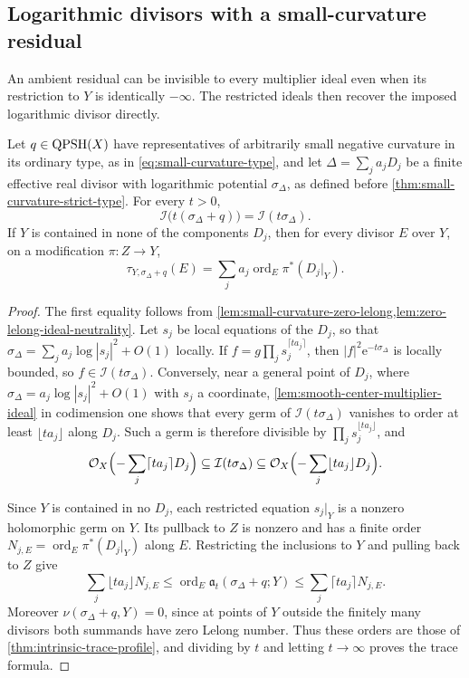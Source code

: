 \subsection{Logarithmic divisors with a small-curvature residual}
\label{subsec:small-curvature-intrinsic-traces}

An ambient residual can be invisible to every multiplier ideal even
when its restriction to $Y$ is identically $-\infty$. The restricted
ideals then recover the imposed logarithmic divisor directly.

\begin{proposition}\label{prop:small-curvature-intrinsic-traces}
Let $q\in\mathrm{QPSH}(X)$ have representatives of arbitrarily small negative
curvature in its ordinary type, as in \eqref{eq:small-curvature-type},
and let $\Delta=\sum_ja_jD_j$ be a finite effective real divisor with
logarithmic potential $\sigma_\Delta$, as defined before
\cref{thm:small-curvature-strict-type}. For every $t>0$,
\[
 \mathcal I\bigl(t(\sigma_\Delta+q)\bigr)
                  =\mathcal I(t\sigma_\Delta).
\]
If $Y$ is contained in none of the components $D_j$, then for every
divisor $E$ over $Y$, on a modification $\pi\colon Z\to Y$,
\[
 \tau_{Y,\sigma_\Delta+q}(E)
     =\sum_ja_j\operatorname{ord}_E\pi^*(D_j|_Y).
\]
\end{proposition}
\begin{proof}
The first equality follows from
\cref{lem:small-curvature-zero-lelong,lem:zero-lelong-ideal-neutrality}.
Let $s_j$ be local equations of the $D_j$, so that
$\sigma_\Delta=\sum_ja_j\log|s_j|^2+O(1)$ locally. If
$f=g\prod_js_j^{\lceil ta_j\rceil}$, then
$|f|^2\mathrm e^{-t\sigma_\Delta}$ is locally bounded, so
$f\in\mathcal I(t\sigma_\Delta)$. Conversely, near a general point of
$D_j$, where $\sigma_\Delta=a_j\log|s_j|^2+O(1)$ with $s_j$ a
coordinate, \cref{lem:smooth-center-multiplier-ideal} in codimension one
shows that every germ of $\mathcal I(t\sigma_\Delta)$ vanishes to order
at least $\lfloor ta_j\rfloor$ along $D_j$. Such a germ is therefore
divisible by $\prod_js_j^{\lfloor ta_j\rfloor}$, and
\[
 \mathcal O_X\Bigl(-\sum_j\lceil ta_j\rceil D_j\Bigr)
 \subseteq\mathcal I(t\sigma_\Delta)
 \subseteq\mathcal O_X\Bigl(-\sum_j\lfloor ta_j\rfloor D_j\Bigr).
\]

Since $Y$ is contained in no $D_j$, each restricted equation $s_j|_Y$
is a nonzero holomorphic germ on $Y$. Its pullback to $Z$ is nonzero
and has a finite order $N_{j,E}=\operatorname{ord}_E\pi^*(D_j|_Y)$ along
$E$. Restricting the inclusions to $Y$ and pulling back to $Z$ give
\[
 \sum_j\lfloor ta_j\rfloor N_{j,E}
 \leq\operatorname{ord}_E\mathfrak a_t(\sigma_\Delta+q;Y)
 \leq\sum_j\lceil ta_j\rceil N_{j,E}.
\]
Moreover $\nu(\sigma_\Delta+q,Y)=0$, since at points of $Y$ outside the
finitely many divisors both summands have zero Lelong number. Thus these
orders are those of \cref{thm:intrinsic-trace-profile}, and dividing by
$t$ and letting $t\to\infty$ proves the trace formula.
\end{proof}
